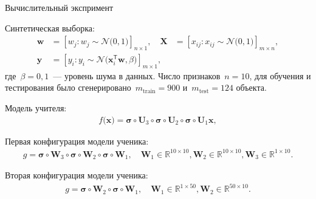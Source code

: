 \documentclass[10pt,pdf,hyperref={unicode}]{beamer}
\begin{document}
\begin{frame}{Вычислительный экспримент}

Синтетическая выборка:
\[
\label{eq:ex:1}
\begin{aligned}
\mathbf{w} &= \left[w_j: w_{j}\sim \mathcal{N}\bigr(0, 1\bigr)\right]_{n\times 1}, \quad \mathbf{X} &= \left[x_{ij}: x_{ij}\sim\mathcal{N}\bigr(0, 1\bigr)\right]_{m\times n}, \\
 \mathbf{y} &= \left[y_i: y_i \sim \mathcal{N}\bigr(\mathbf{x}_i^{\mathsf{T}}\mathbf{w}, \beta\bigr)\right]_{m \times 1},
\end{aligned}
\]
где~$\beta=0{,}1$~--- уровень шума в данных. Число признаков~$n=10$, для обучения и тестирования было сгенерировано~$m_{\text{train}}=900$ и~$m_{\text{test}}=124$ объекта.

Модель учителя:
\[
\begin{aligned}
f\bigr(\mathbf{x}\bigr) = \bm{\sigma} \circ \mathbf{U}_3\circ \bm{\sigma} \circ \mathbf{U}_2\circ\bm{\sigma}\circ \mathbf{U}_1\mathbf{x},
\end{aligned}
\]

Первая конфигурация модели ученика:
\[
\begin{aligned}
g = \bm{\sigma} \circ \mathbf{W}_3 \circ \bm{\sigma} \circ \mathbf{W}_2 \circ \bm{\sigma} \circ \mathbf{W}_1, \quad \mathbf{W}_{1} \in \mathbb{R}^{10 \times 10}, \mathbf{W}_{2} \in \mathbb{R}^{10 \times 10},  \mathbf{W}_{3} \in \mathbb{R}^{1 \times 10}.
\end{aligned}
\]

Вторая конфигурация модели ученика:
\[
\begin{aligned}
g = \bm{\sigma} \circ \mathbf{W}_2 \circ \bm{\sigma} \circ \mathbf{W}_1, \quad \mathbf{W}_{1} \in \mathbb{R}^{1 \times 50}, \mathbf{W}_{2} \in \mathbb{R}^{50 \times 10}.
\end{aligned}
\]
\end{frame}
\end{document}

